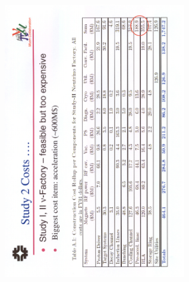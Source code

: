 \documentclass[12pt]{article}
\begin{document}
\begin{minipage}[b]{.43\linewidth}
\vspace{-10mm}
\hspace{-7mm}\includegraphics*[bbllx=0,bblly=0,bburx=263,bbury=384,width=8cm,angle=-90]{./figs_FFAG_introSlides/tabCost.eps}

~~~~~~~~~~~~~~

\end{minipage}\hspace{5mm}
\end{document}
